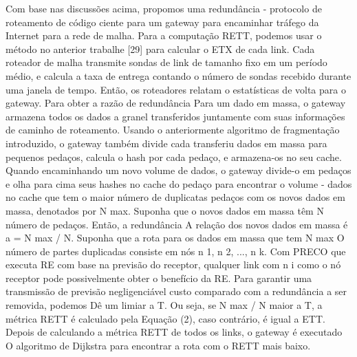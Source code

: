 \documentclass[12pt]{article}
\begin{document}
\begin{enumerate}
		Com base nas discussões acima, propomos uma redundância -
		protocolo de roteamento de código ciente para um gateway para encaminhar tráfego
		da Internet para a rede de malha.
		Para a computação RETT, podemos usar o método no anterior
		trabalhe [29] para calcular o ETX de cada link. Cada roteador de malha
		transmite sondas de link de tamanho fixo em um período médio, e
		calcula a taxa de entrega contando o número de sondas
		recebido durante uma janela de tempo. Então, os roteadores relatam o
		estatísticas de volta para o gateway. Para obter a razão de redundância
		Para um dado em massa, o gateway armazena todos os dados a granel transferidos
		juntamente com suas informações de caminho de roteamento. Usando o anteriormente
		algoritmo de fragmentação introduzido, o gateway também divide cada
		transferiu dados em massa para pequenos pedaços, calcula o hash
		por cada pedaço, e armazena-os no seu cache. Quando
		encaminhando um novo volume de dados, o gateway divide-o em pedaços
		e olha para cima seus hashes no cache do pedaço para encontrar o volume -
		dados no cache que tem o maior número de duplicatas
		pedaços com os novos dados em massa, denotados por N max. Suponha que o
		novos dados em massa têm N número de pedaços. Então, a redundância
		A relação dos novos dados em massa é a = N max / N.
		Suponha que a rota para os dados em massa que tem N max
		O número de partes duplicadas consiste em nós n 1, n 2, ..., n k.
		Com PRECO que executa RE com base na previsão do receptor,
		qualquer link com n i como o nó receptor pode possivelmente obter o
		benefício da RE. Para garantir uma transmissão de previsão negligenciável
		custo comparado com a redundância a ser removida, podemos
		Dê um limiar a T. Ou seja, se N max / N maior a T, a métrica RETT é
		calculado pela Equação (2), caso contrário, é igual a ETT. Depois de
		calculando a métrica RETT de todos os links, o gateway é executado
		O algoritmo de Dijkstra para encontrar a rota com o RETT mais baixo.
		

\end{enumerate}
\end{document}
